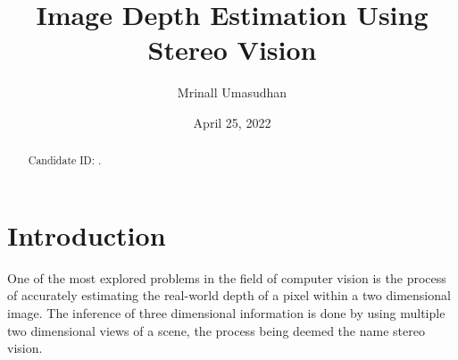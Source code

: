 \documentclass[11pt]{scrartcl}
\begin{document}
\title{Image Depth Estimation Using Stereo Vision}
\author{Mrinall Umasudhan}
\date{April 25, 2022}
\maketitle
{}

\begin{abstract}
  Candidate ID: .
\end{abstract}

\tableofcontents


\newpage

\section{Introduction}
One of the most explored problems in the field of computer vision is the process
of accurately estimating the real-world depth of a pixel within a two dimensional
image. The inference of three dimensional information is done by using multiple two
dimensional views of a scene, the process being deemed the name stereo vision.
\end{document}
